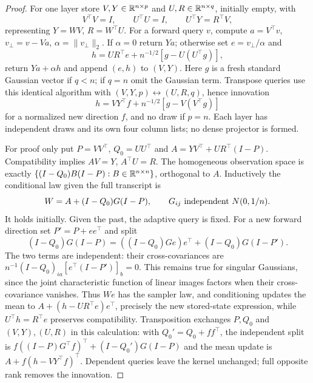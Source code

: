 \begin{proof}
For one layer store $V,Y\in\mathbb R^{n\times p}$ and $U,R\in\mathbb R^{n\times q}$,
initially empty, with
\[
V^\top V=I,\qquad U^\top U=I,\qquad U^\top Y=R^\top V,
\]
representing $Y=WV$, $R=W^\top U$. For a forward query $v$, compute
$a=V^\top v$, $v_\perp=v-Va$, $\alpha=\|v_\perp\|_2$.
If $\alpha=0$ return $Ya$; otherwise set $e=v_\perp/\alpha$ and
\begin{equation}
\label{cp:init:eq:sampler-forward}
h=UR^\top e+n^{-1/2}[g-U(U^\top g)],
\end{equation}
return $Ya+\alpha h$ and append $(e,h)$ to $(V,Y)$.
Here $g$ is a fresh standard Gaussian vector if $q<n$; if $q=n$
omit the Gaussian term. Transpose queries use this identical algorithm
with $(V,Y,p)\leftrightarrow(U,R,q)$, hence innovation
\begin{equation}
\label{cp:init:eq:sampler-transpose}
h=VY^\top f+n^{-1/2}[g-V(V^\top g)]
\end{equation}
for a normalized new direction $f$, and no draw if $p=n$.
Each layer has independent draws and its own four column lists; no
dense projector is formed.

For proof only put $P=VV^\top$, $Q_0=UU^\top$ and
$A=YV^\top+UR^\top(I-P)$. Compatibility implies $AV=Y$, $A^\top U=R$.
The homogeneous observation space is exactly
$\{(I-Q_0)B(I-P):B\in\mathbb R^{n\times n}\}$, orthogonal to $A$.
Inductively the conditional law given the full transcript is
\begin{equation}
\label{cp:init:eq:sampler-kernel}
W=A+(I-Q_0)G(I-P),\qquad G_{ij}\ {\rm independent}\ N(0,1/n).
\end{equation}
It holds initially. Given the past, the adaptive query is fixed.
For a new forward direction set $P'=P+ee^\top$ and split
\[
(I-Q_0)G(I-P)=((I-Q_0)Ge)e^\top+(I-Q_0)G(I-P').
\]
The two terms are independent: their cross-covariances are
$n^{-1}(I-Q_0)_{ia}[e^\top(I-P')]_b=0$.
This remains true for singular Gaussians, since the joint characteristic
function of linear images factors when their cross-covariance vanishes.
Thus $We$ has the sampler law, and conditioning updates the mean to
$A+(h-UR^\top e)e^\top$, precisely the new stored-state expression,
while $U^\top h=R^\top e$ preserves compatibility.
Transposition exchanges $P,Q_0$ and $(V,Y),(U,R)$ in this calculation:
with $Q_0'=Q_0+ff^\top$, the independent split is
$f((I-P)G^\top f)^\top+(I-Q_0')G(I-P)$ and the mean update is
$A+f(h-VY^\top f)^\top$.
Dependent queries leave the kernel unchanged; full opposite rank removes
the innovation.


\end{proof}
